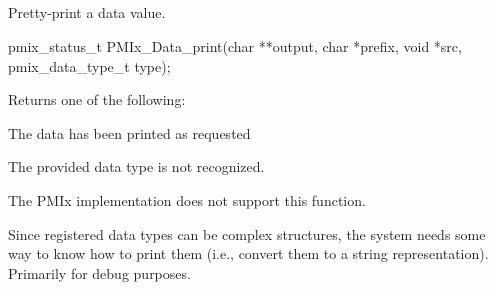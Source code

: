 \subsection{}

\summary

Pretty-print a data value.

\format

\cspecificstart
\begin{codepar}
pmix_status_t
PMIx_Data_print(char **output, char *prefix,
                void *src, pmix_data_type_t type);
\end{codepar}
\cspecificend

\begin{arglist}
\end{arglist}

Returns one of the following:
\begin{constantdesc}
\item {} The data has been printed as requested
\item {} The provided data type is not recognized.
\item {} The \ac{PMIx} implementation does not support this function.
\end{constantdesc}

\descr

Since registered data types can be complex structures, the system needs some way to know how to print them (i.e., convert them to a string representation). Primarily for debug purposes.


\subsection{}

\summary


